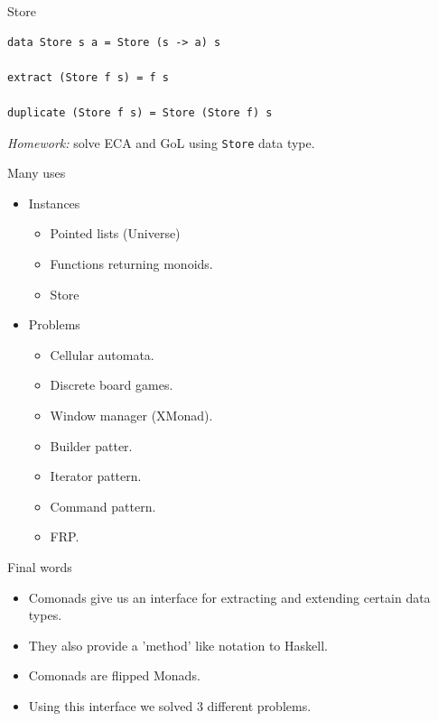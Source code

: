 \documentclass[presentation,aspectratio=169,smaller]{beamer}
\begin{document}
\begin{frame}[label={sec:org4ae3c2f},fragile]{Store}
 \begin{verbatim}
data Store s a = Store (s -> a) s

extract (Store f s) = f s

duplicate (Store f s) = Store (Store f) s
\end{verbatim}

\pause

\emph{Homework:} solve ECA and GoL using \texttt{Store} data type.
\end{frame}

\begin{frame}[label={sec:org170cead}]{Many uses}
\begin{itemize}
\item <1-> Instances
\begin{itemize}
\item Pointed lists (Universe)
\item Functions returning monoids.
\item Store
\end{itemize}
\item <2-> Problems
\begin{itemize}
\item Cellular automata.
\item Discrete board games.
\item Window manager (XMonad).
\item Builder patter.
\item Iterator pattern.
\item Command pattern.
\item FRP.
\end{itemize}
\end{itemize}
\end{frame}

\begin{frame}[label={sec:org509aae5}]{Final words}
\begin{itemize}
\item <1-> Comonads give us an interface for extracting and extending certain data
types.
\item <2-> They also provide a 'method' like notation to Haskell.
\item <3-> Comonads are flipped Monads.
\item <4-> Using this interface we solved 3 different problems.
\end{itemize}
\end{frame}
\end{document}
